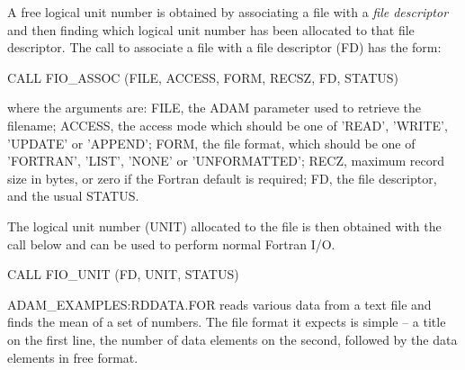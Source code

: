 \documentclass[twoside,11pt,nolof]{starlink}
\begin{document}
A free logical unit number is obtained by associating a file with a {\sl file
descriptor\/} and then finding which logical unit number has been allocated to
that file descriptor.
The call to associate a file with a file descriptor (FD) has the form:
\begin{terminalv}
      CALL FIO_ASSOC (FILE, ACCESS, FORM, RECSZ, FD, STATUS)
\end{terminalv}
where the arguments are: FILE, the ADAM parameter used to retrieve the
filename; ACCESS, the access mode which should be one
of 'READ', 'WRITE', 'UPDATE' or 'APPEND';
FORM, the file format, which should be one of 'FORTRAN', 'LIST', 'NONE'
or 'UNFORMATTED';
RECZ, maximum record size in bytes, or zero if the Fortran default is required;
FD, the file descriptor, and the usual STATUS.

The logical unit number (UNIT) allocated to the file is then obtained with the
call below and can be used to perform normal Fortran I/O.
\begin{terminalv}
      CALL FIO_UNIT (FD, UNIT, STATUS)
\end{terminalv}

ADAM\_EXAMPLES:RDDATA.FOR reads various data from a text file and finds the
mean of a set of numbers.
The file format it expects is simple -- a title on the
first line, the number of data elements on the second, followed by the
data elements in free format.
\end{document}
